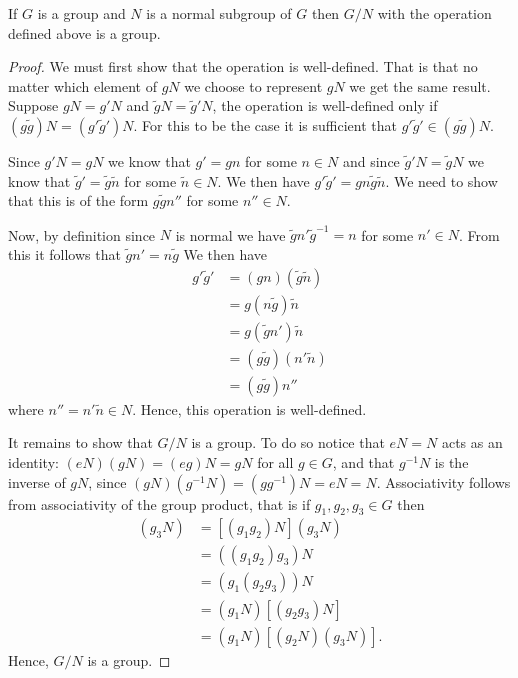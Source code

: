 \begin{thm}{}{}
    If \(G\) is a group and \(N\) is a normal subgroup of \(G\) then \(G/N\) with the operation defined above is a group.
    
    \begin{proof}
        We must first show that the operation is well-defined.
        That is that no matter which element of \(gN\) we choose to represent \(gN\) we get the same result.
        Suppose \(gN = g'N\) and \(\tilde{g}N = \tilde{g}'N\), the operation is well-defined only if \((g\tilde{g})N = (g'\tilde{g}')N\).
        For this to be the case it is sufficient that \(g'\tilde{g}' \in (g\tilde{g})N\).
        
        Since \(g'N = gN\) we know that \(g' = gn\) for some \(n \in N\) and since \(\tilde{g}'N = \tilde{g}N\) we know that \(\tilde{g}' = \tilde{g}\tilde{n}\) for some \(\tilde{n}\in N\).
        We then have \(g'\tilde{g}' = gn\tilde{g}\tilde{n}\).
        We need to show that this is of the form \(g\tilde{g}n''\) for some \(n'' \in N\).
        
        Now, by definition since \(N\) is normal we have \(\tilde{g}n'\tilde{g}^{-1} = n\) for some \(n' \in N\).
        From this it follows that \(\tilde{g}n' = n\tilde{g}\)
        We then have
        \begin{align}
            g'\tilde{g}' &= (gn)(\tilde{g}\tilde{n})\\
            &= g(n\tilde{g})\tilde{n}\\
            &= g(\tilde{g}n')\tilde{n}\\
            &= (g\tilde{g})(n'\tilde{n})\\
            &= (g\tilde{g})n''
        \end{align}
        where \(n'' = n'\tilde{n} \in N\).
        Hence, this operation is well-defined.
        
        It remains to show that \(G/N\) is a group.
        To do so notice that \(eN = N\) acts as an identity: \((eN)(gN) = (eg)N = gN\) for all \(g \in G\), and that \(g^{-1}N\) is the inverse of \(gN\), since \((gN)(g^{-1}N) = (gg^{-1})N = eN = N\).
        Associativity follows from associativity of the group product, that is if \(g_1, g_2, g_3 \in G\) then
        \begin{align}
            [(g_1N)(g_2N)](g_3N) &= [(g_1g_2)N](g_3N)\\
            &= ((g_1g_2)g_3)N\\
            &= (g_1(g_2g_3))N\\
            &= (g_1N)[(g_2g_3)N]\\
            &= (g_1N)[(g_2N)(g_3N)].
        \end{align}
        Hence, \(G/N\) is a group.
    \end{proof}
\end{thm}

